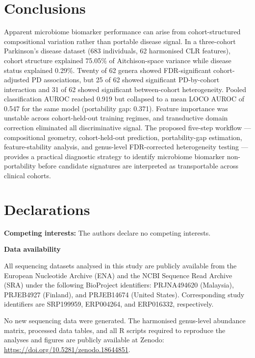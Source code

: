 \documentclass[12pt,a4paper]{article}
\begin{document}
\section{Conclusions}
\label{sec:conclusions}

Apparent microbiome biomarker performance can arise from cohort-structured
compositional variation rather than portable disease signal. In a three-cohort
Parkinson's disease dataset (683 individuals, 62 harmonised CLR features),
cohort structure explained 75.05\% of Aitchison-space variance while disease
status explained 0.29\%. Twenty of 62 genera showed FDR-significant
cohort-adjusted PD associations, but 25 of 62 showed significant
PD-by-cohort interaction and 31 of 62 showed significant between-cohort
heterogeneity. Pooled classification AUROC reached 0.919 but collapsed to a
mean LOCO AUROC of 0.547 for the same model (portability gap: 0.371).
Feature importance was unstable across cohort-held-out training regimes, and
transductive domain correction eliminated all discriminative signal. The
proposed five-step workflow --- compositional geometry, cohort-held-out
prediction, portability-gap estimation, feature-stability analysis, and
genus-level FDR-corrected heterogeneity testing --- provides a practical
diagnostic strategy to identify microbiome biomarker non-portability before
candidate signatures are interpreted as transportable across clinical cohorts.

\section*{Declarations}

\textbf{Competing interests:} The authors declare no competing interests.

\textbf{Data availability}

All sequencing datasets analysed in this study are publicly available from
the European Nucleotide Archive (ENA) and the NCBI Sequence Read Archive
(SRA) under the following BioProject identifiers: PRJNA494620 (Malaysia),
PRJEB4927 (Finland), and PRJEB14674 (United States). Corresponding study
identifiers are SRP199959, ERP004264, and ERP016332, respectively.

No new sequencing data were generated. The harmonised genus-level abundance
matrix, processed data tables, and all R scripts required to reproduce the
analyses and figures are publicly available at Zenodo:
\url{https://doi.org/10.5281/zenodo.18644851}.
\end{document}
